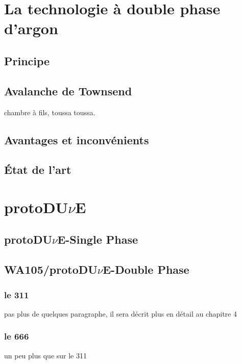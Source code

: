   \section{La technologie à double phase d'argon}
    \subsection{Principe}
    \subsection{Avalanche de Townsend}
      chambre à fils, toussa toussa.
    \subsection{Avantages et inconvénients}
    \subsection{État de l'art}
    
  \section{\texorpdfstring{protoDU$\nu$E}{protoDUNE}}
    \subsection{\texorpdfstring{protoDU$\nu$E}{protoDUNE}-Single Phase}
    \subsection{WA105/\texorpdfstring{protoDU$\nu$E}{protoDUNE}-Double Phase}
      \subsubsection{le 311}
        pas plus de quelques paragraphe, il sera décrit plus en détail au chapitre 4
      \subsubsection{le 666}
        un peu plus que sur le 311
\printbibliography